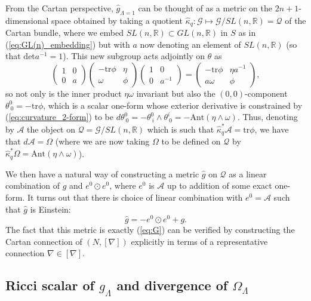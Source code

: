 From the Cartan perspective, $\hat{g}_{\Lambda=1}$ can be thought
of as a metric on the $2n+1$-dimensional space obtained by taking
a quotient $\hat{\kappa}_q:\mathcal{G}\mapsto \mathcal{G}/SL(n,\mathbb{R})=\mathcal{Q}$ of the Cartan
bundle, where we embed $SL(n,\mathbb{R})\subset GL(n,\mathbb{R})$
in $S$ as in (\ref{eq:GL(n)_embedding}) but with $a$ now denoting
an element of $SL(n,\mathbb{R})$ (so that $\mathrm{det}a^{-1}=1$).
This new subgroup acts adjointly on $\theta$ as
\[
\begin{pmatrix}1 & 0\\
0 & a
\end{pmatrix}\begin{pmatrix}-\mathrm{tr}\phi & \eta\\
\omega & \phi
\end{pmatrix}\begin{pmatrix}1 & 0\\
0 & a^{-1}
\end{pmatrix}=\begin{pmatrix}-\mathrm{tr}\phi & \eta a^{-1}\\
a\omega & \phi
\end{pmatrix},
\]
so not only is the inner product $\eta\omega$ invariant but also
the $(0,0)$-component $\theta_{\ 0}^{0}=\mathrm{-tr}\phi$, which
is a scalar one-form whose exterior derivative is constrained by (\ref{eq:curvature_2-form}) to be $ d\theta_{\ 0}^{0}=-\theta_{\ i}^{0}\wedge\theta_{\ 0}^{i}=-\mathrm{Ant}(\eta\wedge\omega)$.
Thus, denoting by $\mathcal{A}$ the object on $\mathcal{Q}=\mathcal{G}/SL(n,\mathbb{R})$
which is such that $\hat{\kappa}_q^{*}\mathcal{A}=\mathrm{tr}\phi$, we have that
$ d\mathcal{A}=\Omega$ (where we are now taking $\Omega$ to be defined on $\mathcal{Q}$ by $\hat{\kappa}_q^{*}\Omega=\mathrm{Ant}(\eta\wedge\omega)$).

We then have a natural way of constructing a metric $\hat{g}$
on $\mathcal{Q}$ as a linear combination of $g$ and $e^{0}\odot e^{0}$,
where $e^{0}$ is $\mathcal{A}$ up to addition of some exact one-form. It turns
out that there is choice of linear combination with $e^0=\mathcal{A}$ such that $\hat{g}$
is Einstein:
\[
\hat{g}=-e^{0}\odot e^{0}+g.
\]
The fact that this metric is exactly (\ref{eq:G}) can be verified
by constructing the Cartan connection of $(N,[\nabla])$ explicitly
in terms of a representative connection $\nabla\in[\nabla]$.

\subsection{Ricci scalar of $g_\Lambda$ and divergence of $\Omega_\Lambda$}

